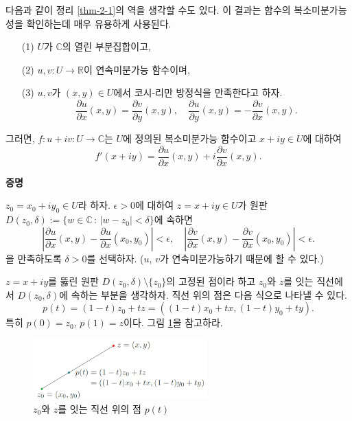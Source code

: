 다음과 같이 정리 \ref{thm-2-1}의 역을 생각할 수도 있다.
이 결과는 함수의 복소미분가능성을 확인하는데 매우 유용하게 사용된다.

\par\smallskip

\begin{salttheorem}{}{} \label{thm-2-2}
\begin{itemize}
\item[(1)] $U$가 $\mathbb C$의 열린 부분집합이고,
\item[(2)] $u,v: U\to \mathbb R$이 연속미분가능 함수이며,
\item[(3)] $u,v$가 $(x,y)\in U$에서 코시-리만 방정식을 만족한다고 하자.
$$
\dfrac{\partial u}{\partial x}(x, y) = \dfrac{\partial v}{\partial y}(x, y),
\quad
\dfrac{\partial u}{\partial y}(x, y) = - \dfrac{\partial v}{\partial x}(x, y).
$$
\end{itemize}
그러면, $f:u+iv: U\to \mathbb C$는 $U$에 정의된 복소미분가능 함수이고
$x+iy\in U$에 대하여
$$
f'(x+iy) = \dfrac{\partial u}{\partial x}(x, y) + i \dfrac{\partial v}{\partial x}(x, y).
$$
\end{salttheorem}

{\bf 증명}

$z_0 = x_0 + iy_0 \in U$라 하자.
$\epsilon>0$에 대하여 
$z=x+iy\in U$가 원판 $D(z_0,\delta) := \{ w \in\mathbb C \,:\, |w-z_0| < \delta \}$에
속하면
\begin{equation}\label{eq-2-7}
\left| \dfrac{\partial u}{\partial x}(x,y) - \dfrac{\partial u}{\partial x}(x_0,y_0) \right| < \epsilon,
\quad
\left| \dfrac{\partial v}{\partial x}(x,y) - \dfrac{\partial v}{\partial x}(x_0,y_0) \right| < \epsilon.
\end{equation}
을 만족하도록 $\delta>0$를 선택하자.
($u$, $v$가 연속미분가능하기 때문에 할 수 있다.)

$z=x+iy$를 뚫린 원판 $D(z_0,\delta)\setminus\{ z_0\}$의 고정된 점이라 하고
$z_0$와 $z$를 잇는 직선에서 $D(z_0,\delta)$에 속하는 부분을 생각하자.
직선 위의 점은 다음 식으로 나타낼 수 있다.
\[
p(t) = (1-t)z_0 + tz = \left( (1-t)x_0+tx, (1-t)y_0+ty \right).
\]
특히 $p(0)=z_0$, $p(1)=z$이다. 그림 \ref{fig-2-7}을 참고하라.

\begin{figure}[!h]
\begin{center}
\includegraphics[width=0.6\textwidth]{./SaltChapter/figs/fig-2-7}
\end{center}
\caption{$z_0$와 $z$를 잇는 직선 위의 점 $p(t)$}
\label{fig-2-7}
\end{figure}

